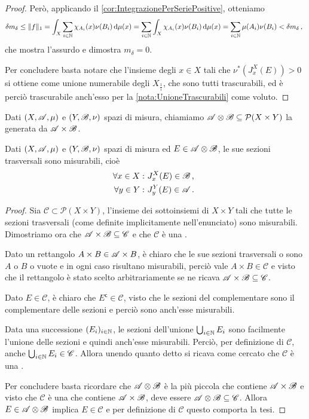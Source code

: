 \begin{proof}
	Però, applicando il \cref{cor:IntegrazionePerSeriePositive}, otteniamo
	\begin{equation*}
		\delta m_\delta \le\Vert f\Vert_1=\int_X \sum_{i\in\mathbb N}\chi_{A_i}(x)\nu(B_i)\,\mathrm d\mu(x)= \sum_{i\in\mathbb N}\int_X \chi_{A_i}(x)\nu(B_i)\,\mathrm d\mu(x)=\sum_{i\in\mathbb N}\mu(A_i)\nu(B_i)<\delta m_\delta\, \text{, }
	\end{equation*}
	che mostra l'assurdo e dimostra $m_\delta=0$.
	
	Per concludere basta notare che l'insieme degli $x\in X$ tali che $\nu^*(J_x^X(E))>0$ si ottiene come unione numerabile degli $X_{\frac 1i}$, che sono tutti trascurabili, ed è perciò trascurabile anch'esso per la \cref{nota:UnioneTrascurabili} come voluto.
\end{proof}

\begin{definition}\label{def:SigAlgProdotto}
	Dati $(X,\mathscr A,\mu)$ e $(Y,\mathscr B,\nu)$ spazi di misura, chiamiamo $\mathscr A\otimes\mathscr B\subseteq \mathcal P(X\times Y)$ la \sigalg{} generata da $\mathscr A\times\mathscr B$. 
\end{definition}

\begin{proposition}\label{prop:SezioniMisurabili}
	Dati $(X,\mathscr A,\mu)$ e $(Y,\mathscr B,\nu)$ spazi di misura ed $E\in\mathscr A\otimes\mathscr B$, le sue sezioni trasversali sono misurabili, cioè
	\begin{align*}
		\forall x\in X:\ &J^X_x(E)\in\mathscr B \, \text{, } \\
		\forall y\in Y:\ &J^Y_y(E)\in\mathscr A \, \text{. }
	\end{align*}
\end{proposition}
\begin{proof}
	\newcommand{\C}{\ensuremath{\mathscr C}}
	Sia $\C\subset\mathcal P(X\times Y)$, l'insieme dei sottoinsiemi di $X\times Y$ tali che tutte le sezioni trasversali (come definite implicitamente nell'enunciato) sono misurabili.
	Dimostriamo ora che $\A\times\B\subseteq \C$ e che $\C$ è una \sigalg{}.
	
	Dato un rettangolo $A\times B\in\mathscr A\times B$, è chiaro che le sue sezioni trasversali o sono $A$ o $B$ o vuote e in ogni caso risultano misurabili, perciò vale $A\times B\in\C$ e visto che il rettangolo è stato scelto arbitrariamente se ne ricava $\A\times\B\subseteq \C$.
	
	Dato $E\in\C$, è chiaro che $E^\mathsf{c}\in\C$, visto che le sezioni del complementare sono il complementare delle sezioni e perciò sono anch'esse misurabili.
	
	Data una successione $(E_i)_{i\in\mathbb N}$, le sezioni dell'unione $\bigcup_{i\in\mathbb N}E_i$ sono facilmente l'unione delle sezioni e quindi anch'esse misurabili. Perciò, per definizione di $\C$, anche $\bigcup_{i\in\N}E_i\in\C$.
	Allora unendo quanto detto si ricava come cercato che $\C$ è una \sigalg{}.
	
	Per concludere basta ricordare che $\mathscr A\otimes\mathscr B$ è la più piccola \sigalg{} che contiene $\mathscr A\times\mathscr B$ e visto che $\C$ è una \sigalg{} che contiene $\mathscr A\times\mathscr B$, deve essere $\A\otimes\B\subseteq\C$. Allora $E\in\mathscr A\otimes\mathscr B$ implica $E\in\C$ e per definizione di $\C$ questo comporta la tesi.
\end{proof}

